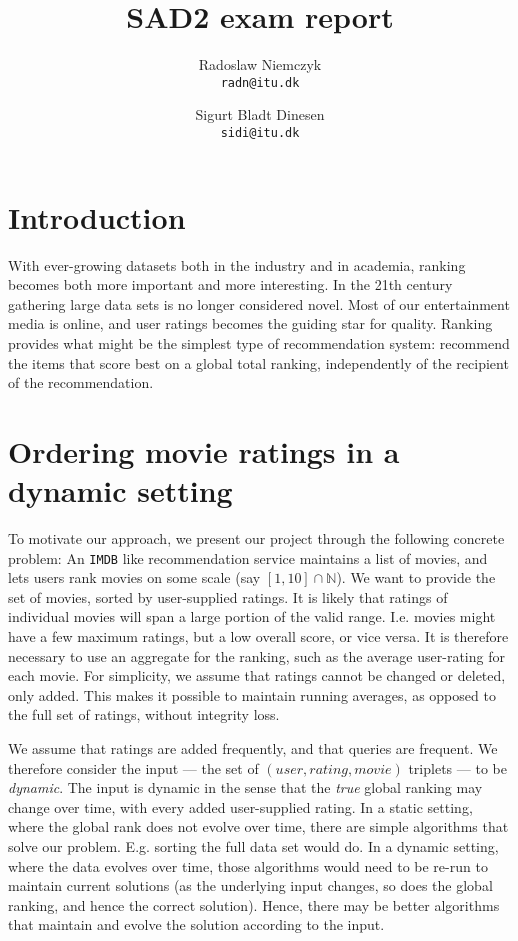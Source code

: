 \documentclass[a4paper, titlepage]{report}
\renewcommand{\%}{\scalebox{.9}{\oldpct}}
\begin{document}
\title{SAD2 exam report}
\author{
	Radoslaw Niemczyk
	\\\texttt{radn@itu.dk}
	\and
	Sigurt Bladt Dinesen
	\\\texttt{sidi@itu.dk}
}

\maketitle

\section{Introduction}
With ever-growing datasets both in the industry and in academia, ranking becomes
both more important and more interesting. In the 21th century gathering large
data sets is no longer considered novel. Most of our entertainment media is
online, and user ratings becomes the guiding star for quality. Ranking provides
what might be the simplest type of recommendation system: recommend the items
that score best on a global total ranking, independently of the recipient of the
recommendation.

\section{Ordering movie ratings in a dynamic setting}
\label{sec:intro_real}
To motivate our approach, we present our project through the following concrete
problem: An \texttt{IMDB} like recommendation service maintains a list of
movies, and lets users rank movies on some scale (say $\left[1,10\right]\cap
\mathbb{N}$). We want to provide the set of movies, sorted by user-supplied
ratings. It is likely that ratings of individual movies will span a large
portion of the valid range. I.e. movies might have a few maximum ratings, but
a low overall score, or vice versa. It is therefore necessary to use an
aggregate for the ranking, such as the average user-rating for each movie. For
simplicity, we assume that ratings cannot be changed or deleted, only added.
This makes it possible to maintain running averages, as opposed to the full set
of ratings, without integrity loss.

We assume that ratings are added frequently, and that queries are frequent. We
therefore consider the input --- the set of $(user, rating, movie)$ triplets ---
to be \textit{dynamic}. The input is dynamic in the sense that the \textit{true}
global ranking may change over time, with every added user-supplied rating. In a
static setting, where the global rank does not evolve over time, there are
simple algorithms that solve our problem. E.g. sorting the full data set would
do.
In a dynamic setting, where the data evolves over time,
those algorithms would need to be re-run to maintain current solutions (as the
underlying input changes, so does the global ranking, and hence the correct
solution). Hence, there may be better algorithms that maintain and evolve the
solution according to the input.
\end{document}
